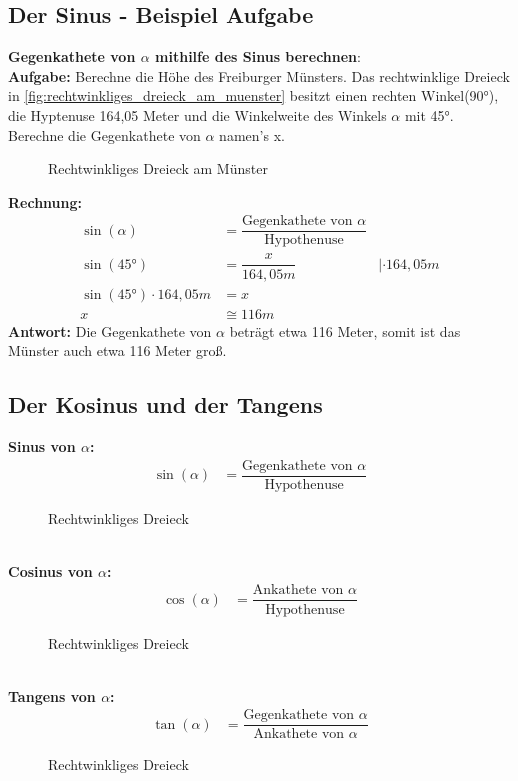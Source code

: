 \documentclass[12pt,a4paper]{article}
\begin{document}
\subsection{Der Sinus - Beispiel Aufgabe}
\textbf{Gegenkathete von $\alpha$ mithilfe des Sinus berechnen}: \\
\textbf{Aufgabe:} Berechne die Höhe des Freiburger Münsters. Das rechtwinklige Dreieck in \autoref{fig:rechtwinkliges_dreieck_am_muenster} besitzt einen rechten Winkel(90°), die Hyptenuse 164,05 Meter und die Winkelweite des Winkels $\alpha$ mit 45°. Berechne die Gegenkathete von $\alpha$ namen's x.
\begin{figure}[hb!]
    \centering
    \def\svgwidth{300px}
    
    \caption{Rechtwinkliges Dreieck am Münster}
  	\label{fig:rechtwinkliges_dreieck_am_muenster}
\end{figure}
\textbf{Rechnung:}
\begin{align}
 \sin(\alpha) &= \dfrac{\text{Gegenkathete von $\alpha$}}{\text{Hypothenuse}} \tag{1}\\
 \sin(45°) &= \dfrac{x}{164,05m} & |\cdot 164,05m \\
 \sin(45°) \cdot 164,05m &= x\\
 x &\cong 116m
\end{align}
\textbf{Antwort:} Die Gegenkathete von $\alpha$ beträgt etwa 116 Meter, somit ist das Münster auch etwa 116 Meter groß.
\newpage
\subsection{Der Kosinus und der Tangens}
\textbf{Sinus von $\alpha$:}
\begin{align}
 \sin(\alpha) &= \dfrac{\text{Gegenkathete von $\alpha$}}{\text{Hypothenuse}} \tag{1}
\end{align}
\begin{figure}[hb!]
    \centering
    \def\svgwidth{200px}
    
    \caption{Rechtwinkliges Dreieck}
  	\label{fig:rechtwinkliges_dreieck_sinus}
\end{figure}
\\
\textbf{Cosinus von $\alpha$:}
\begin{align}
 \cos(\alpha) &= \dfrac{\text{Ankathete von $\alpha$}}{\text{Hypothenuse}} \tag{1}
\end{align}
\begin{figure}[hb!]
    \centering
    \def\svgwidth{200px}
    
    \caption{Rechtwinkliges Dreieck}
  	\label{fig:rechtwinkliges_dreieck_cosinus}
\end{figure}
\\
\textbf{Tangens von $\alpha$:}
\begin{align}
 \tan(\alpha) &= \dfrac{\text{Gegenkathete von $\alpha$}}{\text{Ankathete von $\alpha$}} \tag{1}
\end{align}
\begin{figure}[hb!]
    \centering
    \def\svgwidth{200px}
    
    \caption{Rechtwinkliges Dreieck}
  	\label{fig:rechtwinkliges_dreieck_tangens}
\end{figure}
\newpage
\end{document}
